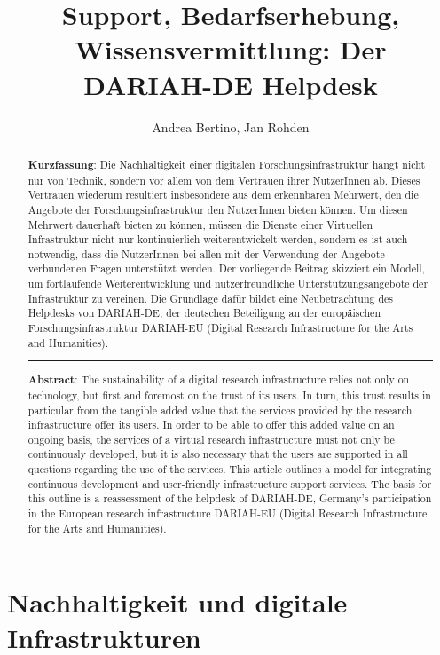 \documentclass[a4paper,
fontsize=11pt,
oneside,
numbers=noperiodatend,
parskip=half-,
bibliography=totoc,
final
]{scrartcl}
\title{\LARGE{Support, Bedarfserhebung, Wissensvermittlung: Der DARIAH-DE Helpdesk}} %
\author{Andrea Bertino, Jan Rohden} %
\date{}
\begin{document}
\maketitle
\thispagestyle{fancyplain} 

\begin{abstract}
\noindent
\textbf{Kurzfassung}: Die Nachhaltigkeit einer digitalen
Forschungsinfrastruktur hängt nicht nur von Technik, sondern vor allem
von dem Vertrauen ihrer NutzerInnen ab. Dieses Vertrauen wiederum
resultiert insbesondere aus dem erkennbaren Mehrwert, den die Angebote
der Forschungsinfrastruktur den NutzerInnen bieten können. Um diesen
Mehrwert dauerhaft bieten zu können, müssen die Dienste einer Virtuellen
Infrastruktur nicht nur kontinuierlich weiterentwickelt werden, sondern
es ist auch notwendig, dass die NutzerInnen bei allen mit der Verwendung
der Angebote verbundenen Fragen unterstützt werden. Der vorliegende
Beitrag skizziert ein Modell, um fortlaufende Weiterentwicklung und
nutzerfreundliche Unterstützungsangebote der Infrastruktur zu vereinen.
Die Grundlage dafür bildet eine Neubetrachtung des Helpdesks von
DARIAH-DE, der deutschen Beteiligung an der europäischen
Forschungsinfrastruktur DARIAH-EU (Digital Research Infrastructure for
the Arts and Humanities).

\begin{center}\rule{0.5\linewidth}{\linethickness}\end{center}

\textbf{Abstract}: The sustainability of a digital research
infrastructure relies not only on technology, but first and foremost on
the trust of its users. In turn, this trust results in particular from
the tangible added value that the services provided by the research
infrastructure offer its users. In order to be able to offer this added
value on an ongoing basis, the services of a virtual research
infrastructure must not only be continuously developed, but it is also
necessary that the users are supported in all questions regarding the
use of the services. This article outlines a model for integrating
continuous development and user-friendly infrastructure support
services. The basis for this outline is a reassessment of the helpdesk
of DARIAH-DE, Germany's participation in the European research
infrastructure DARIAH-EU (Digital Research Infrastructure for the Arts
and Humanities).
\end{abstract}

\hypertarget{nachhaltigkeit-und-digitale-infrastrukturen}{%
\section{Nachhaltigkeit und digitale
Infrastrukturen}\label{nachhaltigkeit-und-digitale-infrastrukturen}}
\end{document}
